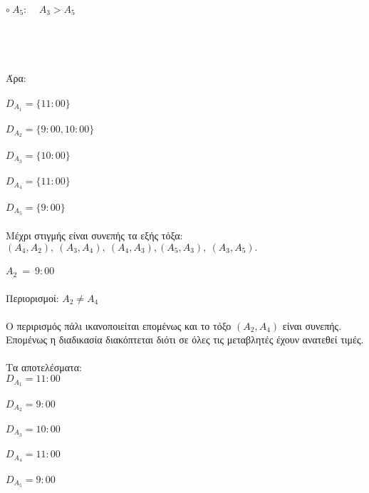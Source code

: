 \documentclass[10pt]{article}
\begin{document}
$\circ \  A_{5}: \ \ \ \ \ A_{3} > A_{5}$ \\\\ \\ \\ \\ 

Άρα: \\ \\

$D_{A_{1}} = \{ 11:00 \} $\\ \\

$ D_{A_{2}} = \{ 9:00, 10:00 \}$ \\ \\

$ D_{A_{3}} = \{ 10:00 \}$ \\ \\

$ D_{A_{4}} = \{ 11:00 \}$ \\ \\

$ D_{A_{5}} = \{ 9:00 \}$ \\ \\

Μέχρι στιγμής είναι συνεπής τα εξής τόξα: $(A_{4},A_{2}),\  (A_{3},A_{4}),\ (A_{4},A_{3}), (A_{5},A_{3}), \ (A_{3},A_{5}).$ \\ \\

$A_{2} \ = \ 9:00$ \\ \\

Περιορισμοί:   $ A_{2} \neq A_{4} $
\\ \\
Ο περιρισμός πάλι ικανοποιείται επομένως και το τόξο  $(A_{2},A_{4})$ είναι συνεπής. Επομένως η διαδικασία διακόπτεται διότι σε όλες τις μεταβλητές έχουν ανατεθεί τιμές. \\ \\
Τα αποτελέσματα: \\
$D_{A_{1}} = 11:00 $\\ \\
$ D_{A_{2}} = 9:00$ \\ \\
$ D_{A_{3}} = 10:00 $ \\ \\
$ D_{A_{4}} = 11:00 $ \\ \\
$ D_{A_{5}} = 9:00$ \\ \\
\end{document}
